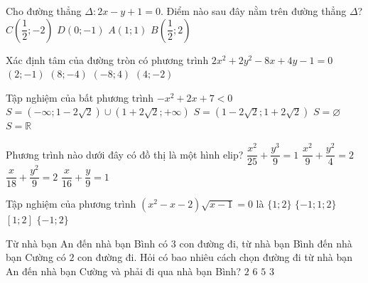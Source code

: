 \begin{ex}%
Cho đường thẳng $\Delta\colon 2x-y+1=0$. Điểm nào sau đây nằm trên đường thẳng $\Delta$?
\choice
{$C\left(\dfrac{1}{2};-2\right)$}
{$D(0;-1)$}
{$A(1;1)$}
{\True $B\left(\dfrac{1}{2};2\right)$}
\loigiai{

}
\end{ex}

\begin{ex}%
Xác định tâm của đường tròn có phương trình $2x^2+2y^2-8x+4y-1=0$
\choice
{$(2;-1)$}
{$(8;-4)$}
{$(-8;4)$}
{\True $(4;-2)$}
\loigiai{

}
\end{ex}

\begin{ex}%
Tập nghiệm của bất phương trình $-x^2+2x+7<0$
\choice
{$S=(-\infty;1-2 \sqrt{2}) \cup(1+2\sqrt{2};+\infty)$}
{\True $S=(1-2\sqrt{2};1+2 \sqrt{2})$}
{$S=\varnothing$}
{$S=\mathbb{R}$}
\loigiai{

}
\end{ex}

\begin{ex}%
Phương trình nào dưới đây có đồ thị là một hình elip?
\choice
{$\dfrac{x^2}{25}+\dfrac{y^3}{9}=1$}
{\True $\dfrac{x^2}{9}+\dfrac{y^2}{4}=2$}
{$\dfrac{x}{18}+\dfrac{y^2}{9}=2$}
{$\dfrac{x}{16}+\dfrac{y}{9}=1$}
\loigiai{

}
\end{ex}

\begin{ex}%
Tập nghiệm của phương trình $(x^2-x-2) \sqrt{x-1}=0$ là
\choice
{$\{1;2\}$}
{\True $\{-1;1;2\}$}
{$[1;2]$}
{$\{-1;2\}$}
\loigiai{

}
\end{ex}

\begin{ex}%
Từ nhà bạn An đến nhà bạn Bình có $3$ con đường đi, từ nhà bạn Bình đến nhà bạn Cường có $2$ con đường đi. Hỏi có bao nhiêu cách chọn đường đi từ nhà bạn An đến nhà bạn Cường và phải đi qua nhà bạn Bình?
\choice
{$2$}
{\True $6$}
{$5$}
{$3$}
\loigiai{

}
\end{ex}

